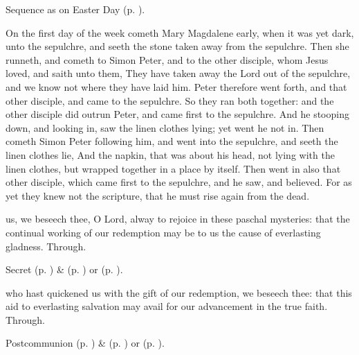 \begin{rubric}
    Sequence as on Easter Day (p. \pageref{PaschalSequence}).
\end{rubric}

 On the first day of the week cometh Mary Magdalene early, when it was yet dark, unto the sepulchre, and seeth the stone taken away from the sepulchre. Then she runneth, and cometh to Simon Peter, and to the other disciple, whom Jesus loved, and saith unto them, They have taken away the Lord out of the sepulchre, and we know not where they have laid him. Peter therefore went forth, and that other disciple, and came to the sepulchre. So they ran both together: and the other disciple did outrun Peter, and came first to the sepulchre. And he stooping down, and looking in, saw the linen clothes lying; yet went he not in. Then cometh Simon Peter following him, and went into the sepulchre, and seeth the linen clothes lie, And the napkin, that was about his head, not lying with the linen clothes, but wrapped together in a place by itself. Then went in also that other disciple, which came first to the sepulchre, and he saw, and believed. For as yet they knew not the scripture, that he must rise again from the dead.


\clearpage
\secret
{} us, we beseech thee, O Lord, alway to rejoice in these paschal mysteries: that the continual working of our redemption may be to us the cause of everlasting gladness. Through.
\begin{rubric}
     Secret  (p. \pageref{EasterSecret}) \&   (p. \pageref{SPAgainst}) or  (p. \pageref{SPChiefBishop}).
\end{rubric}


\postcommunion
{} who hast quickened us with the gift of our redemption, we beseech thee: that this aid to everlasting salvation may avail for our advancement in the true faith. Through.
\begin{rubric}
     Postcommunion  (p. \pageref{EasterPostcommunion}) \&   (p. \pageref{SPAgainst}) or  (p. \pageref{SPChiefBishop}).
\end{rubric}



